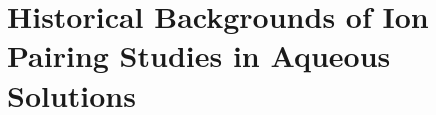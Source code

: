\mainmatter

\pagestyle{fancy}
\fancyhf{}
\renewcommand{\headrulewidth}{0pt}
\fancyfoot[CE,CO]{\thepage}

\titleformat{\section}[block]{\bfseries\large}{\thesection }{1.5em}{}
\titlespacing*{\chapter}{0pt}{-2.5em}{0pt}
\titlespacing*{\section}{0pt}{0pt}{0pt}

\begingroup
\chapter{Historical Backgrounds of Ion Pairing Studies in Aqueous Solutions}
\endgroup

